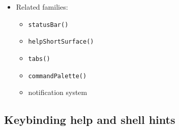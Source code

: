 \begin{itemize}
  \begin{itemize}
  \tightlist
  \item
    rich: full shell chrome with tabs, palette, overlays, notifications, and workspace regions
  \item
    static: retain the active page and essential shell context without pretending background interactivity exists
  \item
    pipe: lower to current page content plus minimal status/context framing
  \item
    accessible: linearize active shell state, navigation context, and current overlays into one readable flow
  \end{itemize}
\item
  Related families:

  \begin{itemize}
  \tightlist
  \item
    \texttt{s\allowbreak{}t\allowbreak{}a\allowbreak{}t\allowbreak{}u\allowbreak{}s\allowbreak{}B\allowbreak{}a\allowbreak{}r\allowbreak{}(\allowbreak{})}
  \item
    \texttt{h\allowbreak{}e\allowbreak{}l\allowbreak{}p\allowbreak{}S\allowbreak{}h\allowbreak{}o\allowbreak{}r\allowbreak{}t\allowbreak{}S\allowbreak{}u\allowbreak{}r\allowbreak{}f\allowbreak{}a\allowbreak{}c\allowbreak{}e\allowbreak{}(\allowbreak{})}
  \item
    \texttt{t\allowbreak{}a\allowbreak{}b\allowbreak{}s\allowbreak{}(\allowbreak{})}
  \item
    \texttt{c\allowbreak{}o\allowbreak{}m\allowbreak{}m\allowbreak{}a\allowbreak{}n\allowbreak{}d\allowbreak{}P\allowbreak{}a\allowbreak{}l\allowbreak{}e\allowbreak{}t\allowbreak{}t\allowbreak{}e\allowbreak{}(\allowbreak{})}
  \item
    notification system
  \end{itemize}
\end{itemize}

\subsection{Keybinding help and shell hints}\label{record-019-keybinding-help-and-shell-hints}

